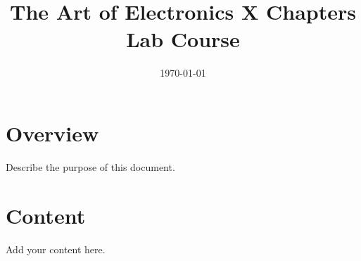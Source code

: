 \documentclass[11pt]{article}
\title{The Art of Electronics X Chapters Lab Course}
\author{}
\date{\today}
\begin{document}
\maketitle

\section{Overview}
Describe the purpose of this document.

\section{Content}
Add your content here.
\end{document}
